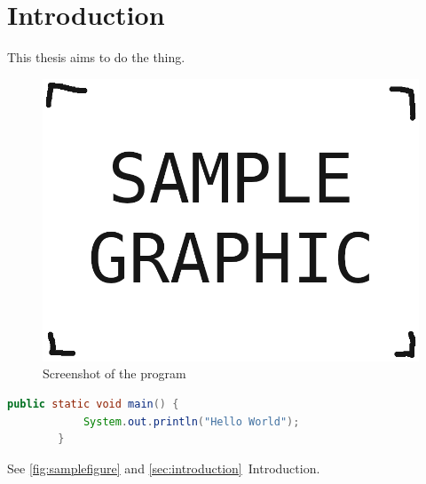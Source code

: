 \documentclass[12pt,a4paper,oneside]{report}
\begin{document}
	\chapter{Introduction} \label{sec:introduction}
	This thesis aims to do the thing\parencite{somewebsite}.
	\begin{figure}[h]
		\includegraphics[width=\textwidth]{sample_graphic.png}
		\vskip0pt
		\caption{Screenshot of the program} \label{fig:samplefigure}
	\end{figure}

	\begin{lstlisting}[language=Java]
		public static void main() {
			System.out.println("Hello World");
		}
	\end{lstlisting}

	See \autoref{fig:samplefigure} and \autoref{sec:introduction}~Introduction.

	\printbibliography[title={\hspace{\fill}Bibliography}]

	\pagebreak
	\listoffigures
\end{document}
